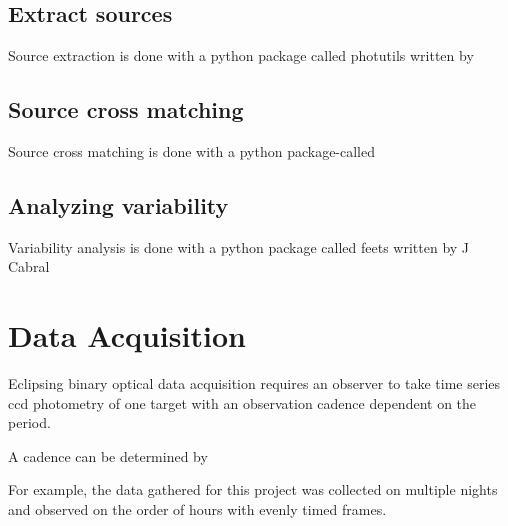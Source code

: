 \subsection{Extract sources}
Source extraction is done with a python package called photutils written by 

\subsection{Source cross matching}
Source cross matching is done with a python package-called 

\subsection{Analyzing variability}
Variability analysis is done with a python package called feets written by J Cabral~\cite{cabral_2018}

\section{Data Acquisition}
Eclipsing binary optical data acquisition requires an observer to take time series ccd photometry of one target with an observation cadence dependent on the period.

A cadence can be determined by 

For example, the data gathered for this project was collected on multiple nights and observed on the order of hours with evenly timed frames.


